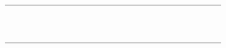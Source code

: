 \documentclass[12pt,a4paper]{article}
\begin{document}
\begin{landscape}
\begin{table}[ht!]
\begin{tabular}{|l|l|l|l|l|l|l|l|l|l|l|l|l|l|l|l|l|l|l|l|l|l|l|l|l|l|}
		 &                                          &    &    &    &    &    &    &    &    &     &     &     &     &     &     &     &     &     &     &     &           \\\hline
		 &                                          &    &    &    &    &    &    &    &    &     &     &     &     &     &     &     &     &     &     &     &           \\\hline
		 &                                          &    &    &    &    &    &    &    &    &     &     &     &     &     &     &     &     &     &     &     &           \\\hline
		 &                                          &    &    &    &    &    &    &    &    &     &     &     &     &     &     &     &     &     &     &     &           \\\hline
		 &                                          &    &    &    &    &    &    &    &    &     &     &     &     &     &     &     &     &     &     &     &           \\\hline
		 &                                          &    &    &    &    &    &    &    &    &     &     &     &     &     &     &     &     &     &     &     &           \\\hline
		 &                                          &    &    &    &    &    &    &    &    &     &     &     &     &     &     &     &     &     &     &     &           \\\hline
		 &                                          &    &    &    &    &    &    &    &    &     &     &     &     &     &     &     &     &     &     &     &           \\\hline
		 &                                          &    &    &    &    &    &    &    &    &     &     &     &     &     &     &     &     &     &     &     &           \\\hline
		 &                                          &    &    &    &    &    &    &    &    &     &     &     &     &     &     &     &     &     &     &     &           \\\hline
		 &                                          &    &    &    &    &    &    &    &    &     &     &     &     &     &     &     &     &     &     &     &           \\\hline
		 &                                          &    &    &    &    &    &    &    &    &     &     &     &     &     &     &     &     &     &     &     &           \\\hline
		 &                                          &    &    &    &    &    &    &    &    &     &     &     &     &     &     &     &     &     &     &     &           \\\hline

\end{tabular}
\end{table}
\end{landscape}
\end{document}

